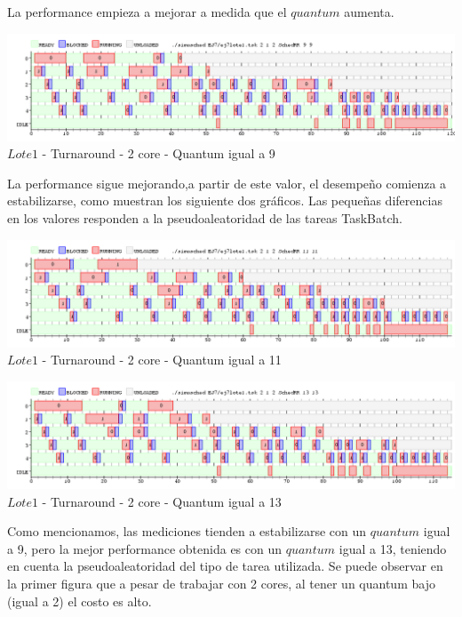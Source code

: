  
 \indent La performance empieza a mejorar a medida que el $quantum$ aumenta.
 
   \begin{center}
    	\includegraphics[width=450pt]{./EJ7/ej7tour2core4quan.png}
	{$Lote 1$ - Turnaround - 2 core - Quantum igual a 9}	
 \end{center}

  
   \indent La performance sigue mejorando,a partir de este valor, el desempeño comienza a estabilizarse,  como muestran los siguiente dos gráficos. 
   Las pequeñas diferencias en los valores responden a la pseudoaleatoridad de las tareas TaskBatch.\\
  
   \begin{center}
    	\includegraphics[width=450pt]{./EJ7/ej7tour2core5quan.png}
	{$Lote 1$ - Turnaround - 2 core - Quantum igual a 11}	
 \end{center}
 

    \begin{center}
    	\includegraphics[width=450pt]{./EJ7/ej7tour2core8quan.png}
	{$Lote 1$ - Turnaround - 2 core - Quantum igual a 13}	
 \end{center}

 \indent Como mencionamos, las mediciones tienden a estabilizarse con un $quantum$ igual a 9, pero la mejor performance
 obtenida es con un $quantum$ igual a 13, teniendo en cuenta la pseudoaleatoridad del tipo de tarea utilizada.
 \indent Se puede observar en la primer figura que a pesar de trabajar con 2 cores, al tener un quantum bajo (igual a 2) 
 el costo es alto.\\
  
